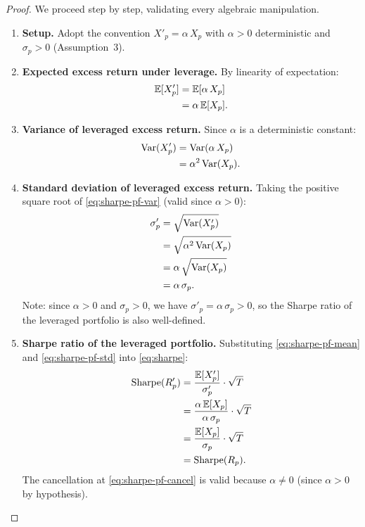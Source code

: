 \documentclass[12pt,openany]{book}
\newcommand{\E}{\mathbb{E}}
\numberwithin{equation}{chapter}
\theoremstyle{plain}
\theoremstyle{definition}
\theoremstyle{remark}
\numberwithin{equation}{chapter}
\theoremstyle{plain}
\begin{document}
\begin{proof}
We proceed step by step, validating every algebraic manipulation.

\begin{enumerate}
  \item \textbf{Setup.}
        Adopt the convention $X'_p = \alpha\,X_p$ with $\alpha > 0$
        deterministic and $\sigma_p > 0$ (Assumption~3).

  \item \textbf{Expected excess return under leverage.}
        By linearity of expectation:
        \begin{align}
          \E[X'_p]
            &= \E[\alpha\,X_p] \notag \\
            &= \alpha\,\E[X_p].
          \label{eq:sharpe-pf-mean}
        \end{align}

  \item \textbf{Variance of leveraged excess return.}
        Since $\alpha$ is a deterministic constant:
        \begin{align}
          \mathrm{Var}(X'_p)
            &= \mathrm{Var}(\alpha\,X_p) \notag \\
            &= \alpha^2\,\mathrm{Var}(X_p).
          \label{eq:sharpe-pf-var}
        \end{align}

  \item \textbf{Standard deviation of leveraged excess return.}
        Taking the positive square root of \eqref{eq:sharpe-pf-var}
        (valid since $\alpha > 0$):
        \begin{align}
          \sigma'_p
            &= \sqrt{\mathrm{Var}(X'_p)} \notag \\
            &= \sqrt{\alpha^2\,\mathrm{Var}(X_p)} \notag \\
            &= \alpha\,\sqrt{\mathrm{Var}(X_p)} \notag \\
            &= \alpha\,\sigma_p.
          \label{eq:sharpe-pf-std}
        \end{align}
        Note: since $\alpha > 0$ and $\sigma_p > 0$, we have
        $\sigma'_p = \alpha\,\sigma_p > 0$, so the Sharpe ratio
        of the leveraged portfolio is also well-defined.

  \item \textbf{Sharpe ratio of the leveraged portfolio.}
        Substituting \eqref{eq:sharpe-pf-mean} and
        \eqref{eq:sharpe-pf-std} into \eqref{eq:sharpe}:
        \begin{align}
          \mathrm{Sharpe}(R'_p)
            &= \frac{\E[X'_p]}{\sigma'_p}\cdot\sqrt{T} \notag \\
            &= \frac{\alpha\,\E[X_p]}{\alpha\,\sigma_p}\cdot\sqrt{T}
            \label{eq:sharpe-pf-cancel} \\
            &= \frac{\E[X_p]}{\sigma_p}\cdot\sqrt{T} \notag \\
            &= \mathrm{Sharpe}(R_p).
          \label{eq:sharpe-pf-result}
        \end{align}
        The cancellation at \eqref{eq:sharpe-pf-cancel} is valid
        because $\alpha \neq 0$ (since $\alpha > 0$ by hypothesis).


\end{enumerate}
\end{proof}
\end{document}
